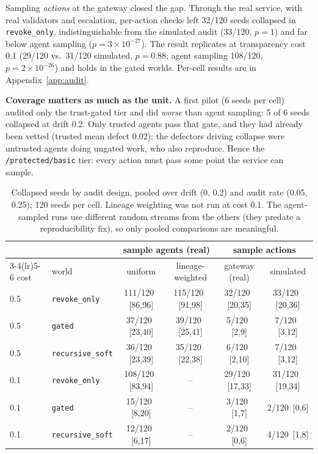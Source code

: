 \documentclass[11pt]{article}
\newcommand{\ci}[2]{\,{\scriptsize\color{gray}[#1,#2]}}
\newcommand{\code}[1]{\texttt{#1}}
\begin{document}
Sampling \emph{actions} at the gateway closed the gap. Through the real service, with real
validators and escalation, per-action checks left 32/120 seeds collapsed in
\code{revoke\_only}, indistinguishable from the simulated audit (33/120, $p = 1$) and far below
agent sampling ($p = 3\times10^{-27}$). The result replicates at transparency cost 0.1 (29/120
vs.\ 31/120 simulated, $p = 0.88$; agent sampling 108/120, $p = 2\times10^{-26}$) and holds
in the gated worlds. Per-cell results are in Appendix~\ref{app:audit}.

\textbf{Coverage matters as much as the unit.} A first pilot (6 seeds per cell) audited only
the trust-gated tier and did \emph{worse} than agent sampling: 5 of 6 seeds collapsed at drift
0.2. Only trusted agents pass that gate, and they had already been vetted (trusted mean defect
0.02); the defectors driving collapse were untrusted agents doing ungated work, who also
reproduce. Hence the \code{/protected/basic} tier: every action must pass some point the
service can sample.

\begin{table}[h]
\centering\small
\begin{tabular}{llcccc}
\toprule
 & & \multicolumn{2}{c}{sample agents (real)} & \multicolumn{2}{c}{sample actions} \\
\cmidrule(lr){3-4}\cmidrule(lr){5-6}
cost & world & uniform & lineage-weighted & gateway (real) & simulated \\
\midrule
0.5 & \code{revoke\_only} & 111/120 \ci{86}{96} & 115/120 \ci{91}{98} & 32/120 \ci{20}{35} & 33/120 \ci{20}{36} \\
0.5 & \code{gated} & 37/120 \ci{23}{40} & 39/120 \ci{25}{41} & 5/120 \ci{2}{9} & 7/120 \ci{3}{12} \\
0.5 & \code{recursive\_soft} & 36/120 \ci{23}{39} & 35/120 \ci{22}{38} & 6/120 \ci{2}{10} & 7/120 \ci{3}{12} \\
\midrule
0.1 & \code{revoke\_only} & 108/120 \ci{83}{94} & -- & 29/120 \ci{17}{33} & 31/120 \ci{19}{34} \\
0.1 & \code{gated} & 15/120 \ci{8}{20} & -- & 3/120 \ci{1}{7} & 2/120 \ci{0}{6} \\
0.1 & \code{recursive\_soft} & 12/120 \ci{6}{17} & -- & 2/120 \ci{0}{6} & 4/120 \ci{1}{8} \\
\bottomrule
\end{tabular}
\caption{Collapsed seeds by audit design, pooled over drift (0, 0.2) and audit rate (0.05,
0.25); 120 seeds per cell. Lineage weighting was not run at cost 0.1. The agent-sampled runs
use different random streams from the others (they predate a reproducibility fix), so only
pooled comparisons are meaningful.}
\label{tab:audit}
\end{table}
\end{document}
